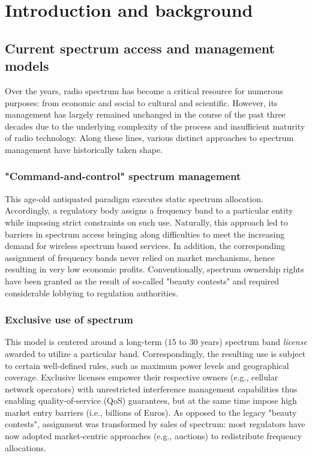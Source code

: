 \documentclass[journal]{IEEEtran}
\begin{document}
\section{Introduction and background}

\subsection{Current spectrum access and management models}

Over the years, radio spectrum has become a critical resource for numerous purposes: from economic and social to cultural and scientific. However, its management has largely remained unchanged in the course of the past three decades due to the underlying complexity of the process and insufficient maturity of radio technology. Along these lines, various distinct approaches to spectrum management have historically taken shape.

\subsubsection{"Command-and-control" spectrum management} This age-old antiquated paradigm executes static spectrum allocation. Accordingly, a regulatory body assigns a frequency band to a particular entity while imposing strict constraints on such use. Naturally, this approach led to barriers in spectrum access bringing along difficulties to meet the increasing demand for wireless spectrum based services. In addition, the corresponding assignment of frequency bands never relied on market mechanisms, hence resulting in very low economic profits. Conventionally, spectrum ownership rights have been granted as the result of so-called "beauty contests" and required considerable lobbying to regulation authorities.

\subsubsection{Exclusive use of spectrum} This model is centered around a long-term ($15$ to $30$ years) spectrum band \textit{license} awarded to utilize a particular band. Correspondingly, the resulting use is subject to certain well-defined rules, such as maximum power levels and geographical coverage. Exclusive licenses empower their respective owners (e.g., cellular network operators) with unrestricted interference management capabilities thus enabling quality-of-service (QoS) guarantees, but at the same time impose high market entry barriers (i.e., billions of Euros). As opposed to the legacy "beauty contests", assignment was transformed by sales of spectrum: most regulators have now adopted market-centric approaches (e.g., auctions) to redistribute frequency allocations.
\end{document}

